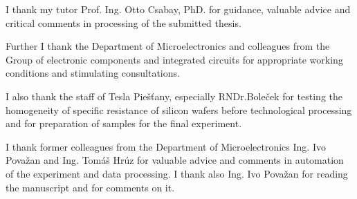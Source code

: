 \iffalse
\par Ďakujem svojmu školiteľovi Prof. Ing. Ottovi Csabayovi, DrSc. za
usmerňovanie, cenné rady a kritické pripomienky pri spracovaní
predloženej kandidátskej práce.
\par Ďakujem ďalej vedeniu Katedry mikroelektroniky a kolegom z
Oddelenia elektronických prvkov a integrovaných obvodov za vytvorené
pracovné podmienky a podnetné konzultácie.
\par Ďakujem tiež pracovníkom Tesly Piešťany, najmä RNDr.Bolečkovi za
otestovanie homogenity špecifického odporu kremíkových dosiek pred
technologickým spracovaním a za prípravu vzoriek pre záverečný
experiment.
\par Ďakujem bývalým pracovníkom Katedry mikroelektroniky
Ing. Ivovi Považanovi a Ing. Tomášovi Hrúzovi za cenné rady a
pripomienky v oblasti automatizácie experimentu a spracovania
dát. Ing.Považanovi ďakujem aj za prečítanie práce a pripomienky k
nej.
\fi

\par
I thank my tutor Prof. Ing. Otto Csabay, PhD. for guidance, valuable
advice and critical comments in processing of the submitted thesis.

\par
Further I thank the Department of Microelectronics and colleagues from
the Group of electronic components and integrated circuits for
appropriate working conditions and stimulating consultations.

\par
I also thank the staff of Tesla Piešťany, especially RNDr.Boleček for
testing the homogeneity of specific resistance of silicon wafers
before technological processing and for preparation of samples for the
final experiment.

\par
I thank former colleagues from the Department of Microelectronics
Ing. Ivo Považan and Ing. Tomáš Hrúz for valuable advice and comments
in automation of the experiment and data processing. I thank also
Ing. Ivo Považan for reading the manuscript and for comments on it.
